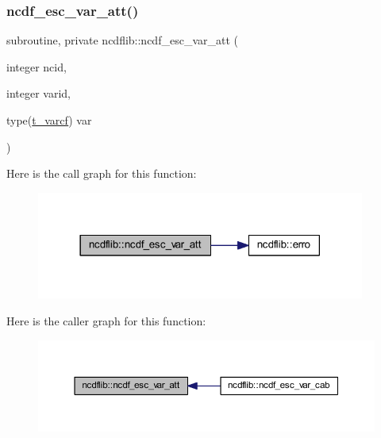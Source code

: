 \subsubsection{\texorpdfstring{ncdf\+\_\+esc\+\_\+var\+\_\+att()}{ncdf\_esc\_var\_att()}}
{\footnotesize\ttfamily subroutine, private ncdflib\+::ncdf\+\_\+esc\+\_\+var\+\_\+att (\begin{DoxyParamCaption}\item[{integer}]{ncid,  }\item[{integer}]{varid,  }\item[{type(\mbox{\hyperlink{structncdflib_1_1t__varcf}{t\+\_\+varcf}})}]{var }\end{DoxyParamCaption})\hspace{0.3cm}{\ttfamily [private]}}

Here is the call graph for this function\+:\nopagebreak
\begin{figure}[H]
\begin{center}
\leavevmode
\includegraphics[width=306pt]{namespacencdflib_acbe4ff328732b4674512c190b8c2d5b5_cgraph}
\end{center}
\end{figure}
Here is the caller graph for this function\+:\nopagebreak
\begin{figure}[H]
\begin{center}
\leavevmode
\includegraphics[width=350pt]{namespacencdflib_acbe4ff328732b4674512c190b8c2d5b5_icgraph}
\end{center}
\end{figure}
\mbox{\label{namespacencdflib_a5a3613be95873626820a361a60fb2876}} 
